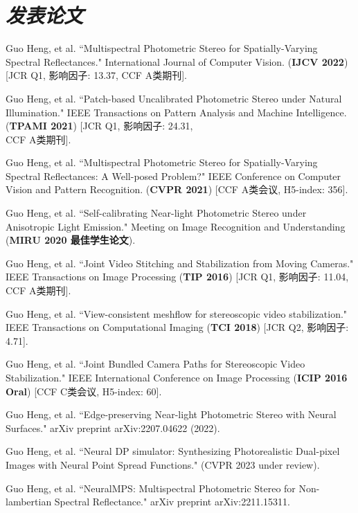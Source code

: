 \documentclass[UTF8]{ctexart}
\begin{document}
	\section{\textit{\textbf{发表论文}}}
	\begin{enumerate}[label={[\arabic*]}]
		\item Guo Heng, et al. ``Multispectral Photometric Stereo for Spatially-Varying Spectral Reflectances." International Journal of Computer Vision. (\textbf{IJCV 2022}) [JCR Q1, 影响因子: 13.37, CCF A类期刊]. 
		\item Guo Heng, et al. ``Patch-based Uncalibrated Photometric Stereo under Natural Illumination." 
		IEEE Transactions on Pattern Analysis and Machine Intelligence. (\textbf{TPAMI 2021}) [JCR Q1, 影响因子: 24.31,\\ CCF A类期刊]. 
		\item Guo Heng, et al. ``Multispectral Photometric Stereo for Spatially-Varying Spectral Reflectances: A Well-posed Problem?" IEEE Conference on Computer Vision and Pattern Recognition. (\textbf{CVPR 2021}) [CCF A类会议, H5-index: 356]. 
		\item Guo Heng, et al. ``Self-calibrating Near-light Photometric Stereo under Anisotropic Light Emission." Meeting on Image Recognition and Understanding (\textbf{MIRU 2020 最佳学生论文}).  
		\item Guo Heng, et al. ``Joint Video Stitching and Stabilization from Moving Cameras." IEEE Transactions on Image Processing (\textbf{TIP 2016}) [JCR Q1, 影响因子: 11.04, CCF A类期刊].
		\item Guo Heng, et al. ``View-consistent meshflow for stereoscopic video stabilization." IEEE Transactions on Computational Imaging (\textbf{TCI 2018}) [JCR Q2, 影响因子: 4.71].
		\item Guo Heng, et al. ``Joint Bundled Camera Paths for Stereoscopic Video Stabilization." IEEE International Conference on Image Processing (\textbf{ICIP 2016 Oral}) [CCF C类会议, H5-index: 60].
		\item Guo Heng, et al. ``Edge-preserving Near-light Photometric Stereo with Neural Surfaces." arXiv preprint arXiv:2207.04622 (2022). 
		\item Guo Heng, et al. ``Neural DP simulator: Synthesizing Photorealistic Dual-pixel Images with Neural Point Spread Functions." (CVPR 2023 under review). 
		\item Guo Heng, et al. ``NeuralMPS: Multispectral Photometric Stereo for Non-lambertian Spectral Reflectance." arXiv preprint arXiv:2211.15311. 
	\end{enumerate}
	
\end{document}
